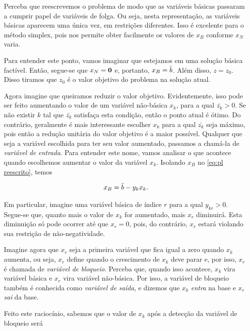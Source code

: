 Perceba que reescrevemos o problema de modo que as variáveis básicas passaram a cumprir papel de variáveis de folga. Ou seja, nesta representação, as variáveis básicas aparecem uma única vez, em restrições diferentes. Isso é excelente para o método simplex, pois nos permite obter facilmente os valores de $  x_B$ conforme $  x_N$ varia.

Para entender este ponto, vamos imaginar que estejamos em uma solução básica factível. Então, segue-se que $  x_N = \vb 0$ e, portanto, $  x_B = \bar{b}$. Além disso, $z = z_0$. Disso tiramos que $z_0$ é o valor objetivo do problema na solução atual.

Agora imagine que queiramos reduzir o valor objetivo. Evidentemente, isso pode ser feito aumentando o valor de um variável não-básica $ x_k$, para a qual $\bar{ z_k} > 0$. Se não existir $k$ tal que $\bar{ z_k}$ satisfaça esta condição, então o ponto atual é ótimo. Do contrário, geralmente é mais interessante escolher $ x_k$ para a qual $\bar{ z_k}$ seja máximo, pois então a redução unitária do valor objetivo é a maior possível. Qualquer que seja a variável escolhida para ter seu valor aumentado, passamos a chamá-la de \emph{variável de entrada}. Para entender este nome, vamos analisar o que acontece quando escolhemos aumentar o valor da variável $ x_k$. Isolando $  x_B$ no \cref{eq:pl reescrito}, temos

\begin{equation}\label{eq:base na troca}
      x_B = \bar{b} - { y_k x_k}.
\end{equation}

Em particular, imagine uma variável básica de índice $r$ para a qual $y_{kr} > 0$. Segue-se que, quanto mais o valor de $ x_k$ for aumentado, mais $ x_r$ diminuirá. Esta diminuição só pode ocorrer até que $ x_r = 0$, pois, do contrário, $ x_r$ estará violando sua restrição de não-negatividade.

Imagine agora que $ x_r$ seja a primeira variável que fica igual a zero quando $ x_k$ aumenta, ou seja, $ x_r$ define quando o crescimento de $ x_k$ deve parar e, por isso, $ x_r$ é chamada de \emph{variável de bloqueio}. Perceba que, quando isso acontece, $ x_k$ vira variável básica e $ x_r$ vira variável não-básica. Por isso, a variável de bloqueio também é conhecida como \emph{variável de saída}, e dizemos que $ x_k$ \emph{entra} na base e $ x_r$ \emph{sai} da base.

Feito este raciocínio, sabemos que o valor de $ x_k$ após a detecção da variável de bloqueio será

